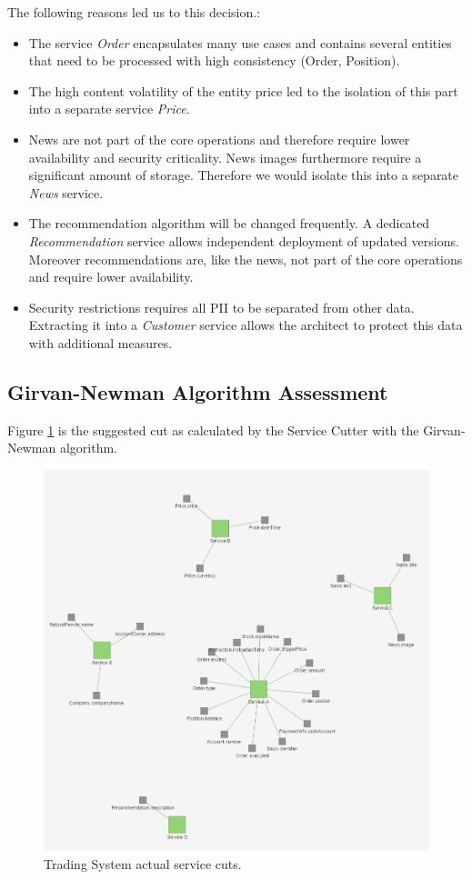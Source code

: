 The following reasons led us to this decision.:
\begin{itemize}
	\item The service \textit{Order} encapsulates many use cases and contains several entities that need to be processed with high consistency (Order, Position).
	\item The high content volatility of the entity price led to the isolation of this part into a separate service \textit{Price}.
	\item News are not part of the core operations and therefore require lower availability and security criticality. News images furthermore require a significant amount of storage. Therefore we would isolate this into a separate \textit{News} service.
	\item The recommendation algorithm will be changed frequently. A dedicated \textit{Recommendation} service allows independent deployment of updated versions. Moreover recommendations are, like the news, not part of the core operations and require lower availability. 
	\item Security restrictions requires all \gls{PII} to be separated from other data. Extracting it into a \textit{Customer} service allows the architect to protect this data with additional measures. 
\end{itemize}


\subsection{Girvan-Newman Algorithm Assessment}

Figure \ref{fig:tradingCutsTool} is the suggested cut as calculated by the Service Cutter with the Girvan-Newman algorithm. 

\begin{figure}[H]
	\includegraphics[scale=0.5]{images/trading_service_cut.png}
	\caption{Trading System actual service cuts.}
	\label{fig:tradingCutsTool}
\end{figure}


